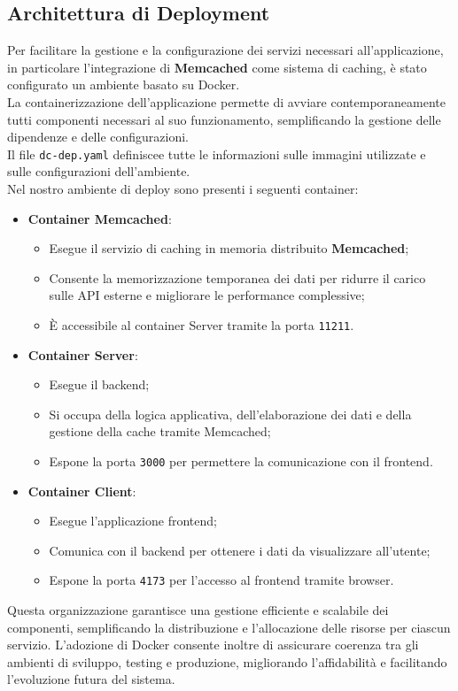 \subsection{Architettura di Deployment}

Per facilitare la gestione e la configurazione dei servizi necessari all'applicazione, in particolare l'integrazione di \textbf{Memcached} come sistema di caching, è stato configurato un ambiente basato su Docker.\\
La containerizzazione dell'applicazione permette di avviare contemporaneamente tutti componenti necessari al suo funzionamento, semplificando la gestione delle dipendenze e delle configurazioni.\\
Il file \texttt{dc-dep.yaml} definiscee tutte le informazioni sulle immagini utilizzate e sulle configurazioni dell'ambiente.\\

Nel nostro ambiente di deploy sono presenti i seguenti container:

\begin{itemize}
    \item \textbf{Container Memcached}:
    \begin{itemize}
        \item Esegue il servizio di caching in memoria distribuito \textbf{Memcached};
        \item Consente la memorizzazione temporanea dei dati per ridurre il carico sulle API esterne e migliorare le performance complessive;
        \item È accessibile al container Server tramite la porta \texttt{11211}.
    \end{itemize}
    
    \item \textbf{Container Server}:
    \begin{itemize}
        \item Esegue il backend;
        \item Si occupa della logica applicativa, dell'elaborazione dei dati e della gestione della cache tramite Memcached;
        \item Espone la porta \texttt{3000} per permettere la comunicazione con il frontend.
    \end{itemize}
    
    \item \textbf{Container Client}:
    \begin{itemize}
        \item Esegue l'applicazione frontend;
        \item Comunica con il backend per ottenere i dati da visualizzare all'utente;
        \item Espone la porta \texttt{4173} per l'accesso al frontend tramite browser.
    \end{itemize}
\end{itemize}

Questa organizzazione garantisce una gestione efficiente e scalabile dei componenti, semplificando la distribuzione e l'allocazione delle risorse per ciascun servizio. 
L'adozione di Docker consente inoltre di assicurare coerenza tra gli ambienti di sviluppo, testing e produzione, migliorando l'affidabilità e facilitando l'evoluzione futura del sistema.
